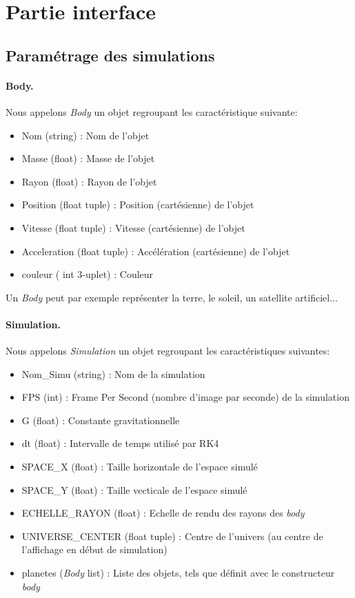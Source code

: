 \documentclass{article}
\begin{document}
\section{Partie interface}
    \subsection{Paramétrage des simulations}

    \paragraph{Body.}
    Nous appelons \emph{Body} un objet regroupant les caractéristique suivante: 

    \begin{itemize}
        \item Nom (string) : Nom de l'objet
        \item Masse (float) : Masse de l'objet
        \item Rayon (float) : Rayon de l'objet
        \item Position (float tuple) : Position (cartésienne) de l'objet
        \item Vitesse (float tuple) : Vitesse (cartésienne) de l'objet
        \item Acceleration (float tuple) : Accélération (cartésienne) de l'objet
        \item couleur ( int 3-uplet) : Couleur
    \end{itemize}

    Un \emph{Body} peut par exemple représenter la terre, le soleil, un satellite artificiel...

    \paragraph{Simulation.}
    Nous appelons \emph{Simulation} un objet regroupant les caractéristiques suivantes:

    \begin{itemize}
        \item Nom\_Simu (string) : Nom de la simulation
        \item FPS (int) : Frame Per Second (nombre d'image par seconde) de la simulation
        \item G (float) : Constante gravitationnelle
        \item dt (float) : Intervalle de temps utilisé par RK4
        \item SPACE\_X (float) : Taille horizontale de l'espace simulé
        \item SPACE\_Y (float) : Taille vecticale de l'espace simulé
        \item ECHELLE\_RAYON (float) : Echelle de rendu des rayons des \emph{body}
        \item UNIVERSE\_CENTER (float tuple) : Centre de l'univers (au centre de l'affichage en début de simulation)
        \item planetes (\emph{Body} list) : Liste des objets, tels que définit avec le constructeur \emph{body}
    \end{itemize} \\
\end{document}

